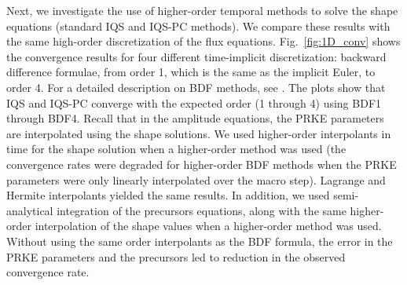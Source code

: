 \documentclass{elsarticle}
\newcommand{\fig}[1]{Fig.~\ref{#1}}                      %
\newcommand{\iqspc}{IQS-PC\xspace}
\begin{document}
\clearpage
\newpage


Next, we investigate the use of higher-order temporal methods to solve the shape equations (standard IQS and \iqspc methods). We compare these results with the same high-order discretization of the flux equations. 
\fig{fig:1D_conv} shows the convergence results for four different time-implicit discretization: backward difference formulae, from order 1, which is the same as the implicit Euler, to order 4. For a detailed description on BDF methods, see \cite{Gear:2007}. The plots show that IQS and \iqspc converge with the expected order (1 through 4) using BDF1 through BDF4. Recall that in the amplitude equations, the PRKE parameters are interpolated using the shape solutions. We used higher-order interpolants in time for the shape solution when a higher-order method was used (the convergence rates were degraded for higher-order BDF methods when the PRKE parameters were only linearly interpolated over the macro step). Lagrange and Hermite interpolants yielded the same results. In addition, we used semi-analytical integration of the precursors equations, along with the same higher-order interpolation of the shape values when a higher-order method was used. Without using the same order interpolants as the BDF formula, the error in the PRKE parameters and the precursors led to reduction in the observed convergence rate.

\end{document}
